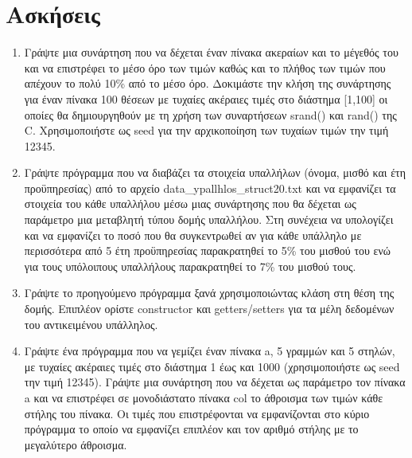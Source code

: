 



\section{Ασκήσεις}
\begin{enumerate}
\item Γράψτε μια συνάρτηση που να δέχεται έναν πίνακα ακεραίων και το μέγεθός του και να επιστρέφει το μέσο όρο των τιμών καθώς και το πλήθος των τιμών που απέχουν το πολύ 10\% από το μέσο όρο. Δοκιμάστε την κλήση της συνάρτησης για έναν πίνακα 100 θέσεων με τυχαίες ακέραιες τιμές στο διάστημα [1,100] οι οποίες θα δημιουργηθούν με τη χρήση των συναρτήσεων srand() και rand() της C. Χρησιμοποιήστε ως seed για την αρχικοποίηση των τυχαίων τιμών την τιμή 12345.

\item Γράψτε πρόγραμμα που να διαβάζει τα στοιχεία υπαλλήλων (όνομα, μισθό και έτη προϋπηρεσίας) από το αρχείο data\_ypallhlos\_struct20.txt και να εμφανίζει τα στοιχεία του κάθε υπαλλήλου μέσω μιας συνάρτησης που θα δέχεται ως παράμετρο μια μεταβλητή τύπου δομής υπαλλήλου. Στη συνέχεια να υπολογίζει και να εμφανίζει το ποσό που θα συγκεντρωθεί αν για κάθε υπάλληλο με περισσότερα από 5 έτη προϋπηρεσίας παρακρατηθεί το 5\% του μισθού του ενώ για τους υπόλοιπους υπαλλήλους παρακρατηθεί το 7\% του μισθού τους.

\item Γράψτε το προηγούμενο πρόγραμμα ξανά χρησιμοποιώντας κλάση στη θέση της δομής. Επιπλέον ορίστε constructor και getters/setters για τα μέλη δεδομένων του αντικειμένου υπάλληλος.

\item Γράψτε ένα πρόγραμμα που να γεμίζει έναν πίνακα a, 5 γραμμών και 5 στηλών, με τυχαίες ακέραιες τιμές στο διάστημα 1 έως και 1000 (χρησιμοποιήστε ως seed την τιμή 12345). Γράψτε μια συνάρτηση που να δέχεται ως παράμετρο τον πίνακα a και να επιστρέφει σε μονοδιάστατο πίνακα col το άθροισμα των τιμών κάθε στήλης του πίνακα. Οι τιμές που επιστρέφονται να εμφανίζονται στο κύριο πρόγραμμα το οποίο να εμφανίζει επιπλέον και τον αριθμό στήλης με το μεγαλύτερο άθροισμα.
\end{enumerate}




